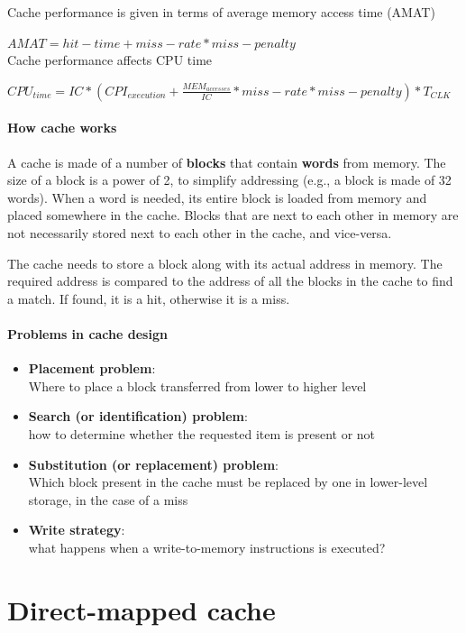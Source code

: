 Cache performance is given in terms of average memory access time (AMAT)

$AMAT = hit-time + miss-rate * miss-penalty$\\

Cache performance affects CPU time

$CPU_{time} = IC * (CPI_{execution} + \frac{MEM_{accesses}}{IC} * miss-rate * miss-penalty) * T_{CLK}$

\paragraph{How cache works}
A cache is made of a number of \textbf{blocks} that contain \textbf{words} from memory.
The size of a block is a power of 2, to simplify addressing (e.g., a block is made of 32 words).
When a word is needed, its entire block is loaded from memory and placed somewhere in the cache.
Blocks that are next to each other in memory are not necessarily stored next to each other in the cache, and vice-versa.

The cache needs to store a block along with its actual address in memory.
The required address is compared to the address of all the blocks in the cache to find a match.
If found, it is a hit, otherwise it is a miss.

\paragraph{Problems in cache design}
\begin{itemize}
    \item \textbf{Placement problem}:\\
    Where to place a block transferred from lower to higher level
    \item \textbf{Search (or identification) problem}:\\
    how to determine whether the requested item is present or not
    \item \textbf{Substitution (or replacement) problem}:\\
    Which block present in the cache must be replaced by one in lower-level storage, in the case of a miss
    \item \textbf{Write strategy}:\\
    what happens when a write-to-memory instructions is executed?
\end{itemize}

\section{Direct-mapped cache}


